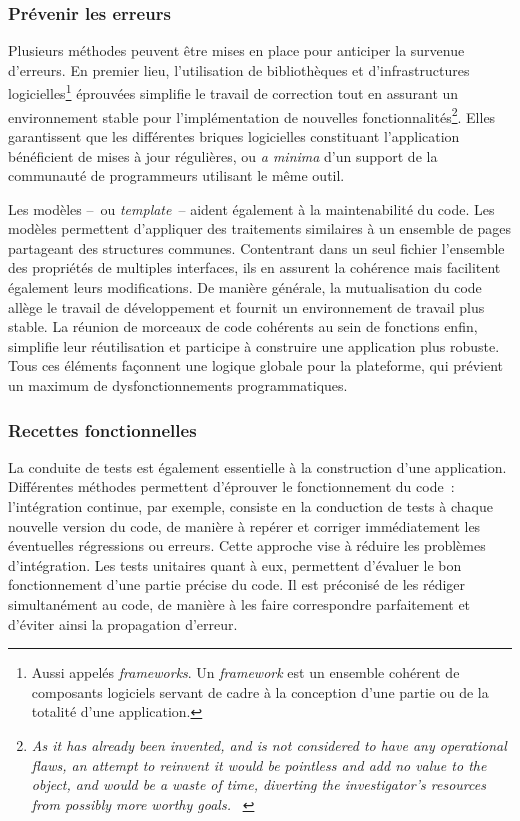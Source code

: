 \documentclass[a4paper,12pt,twoside]{book}
\newcommand{\eng}{\emph}
\newcommand{\g}[1]{\og#1~\fg}
\begin{document}
				\subsubsection{Prévenir les erreurs}
Plusieurs méthodes peuvent être mises en place pour anticiper la survenue d'erreurs. En premier lieu, l'utilisation de bibliothèques et d'infrastructures logicielles\footnote{Aussi appelés \eng{frameworks}. Un \eng{framework} est un ensemble cohérent de composants logiciels servant de cadre à la conception d'une partie ou de la totalité d'une application.} éprouvées simplifie le travail de correction tout en assurant un environnement stable pour l'implémentation de nouvelles fonctionnalités\footnote{\g{\eng{As it has already been invented, and is not considered to have any operational flaws, an attempt to reinvent it would be pointless and add no value to the object, and would be a waste of time, diverting the investigator's resources from possibly more worthy goals.}} \cite{ReinventingWheel}}. Elles garantissent que les différentes briques logicielles constituant l'application bénéficient de mises à jour régulières, ou \emph{a minima} d'un support de la communauté de programmeurs utilisant le même outil.

Les modèles –~ou \eng{template}~– aident également à la maintenabilité du code. Les modèles permettent d'appliquer des traitements similaires à un ensemble de pages partageant des structures communes. Contentrant dans un seul fichier l'ensemble des propriétés de multiples interfaces, ils en assurent la cohérence mais facilitent également leurs modifications. De manière générale, la mutualisation du code allège le travail de développement et fournit un environnement de travail plus stable. La réunion de morceaux de code cohérents au sein de fonctions enfin, simplifie leur réutilisation et participe à construire une application plus robuste. Tous ces éléments façonnent une logique globale pour la plateforme, qui prévient un maximum de dysfonctionnements programmatiques.

				\subsubsection{Recettes fonctionnelles}
La conduite de tests est également essentielle à la construction d'une application. Différentes méthodes permettent d'éprouver le fonctionnement du code~: l'intégration continue, par exemple, consiste en la conduction de tests à chaque nouvelle version du code, de manière à repérer et corriger immédiatement les éventuelles régressions ou erreurs. Cette approche vise à réduire les problèmes d'intégration. Les tests unitaires quant à eux, permettent d'évaluer le bon fonctionnement d'une partie précise du code. Il est préconisé de les rédiger simultanément au code, de manière à les faire correspondre parfaitement et d'éviter ainsi la propagation d'erreur.
\end{document}
